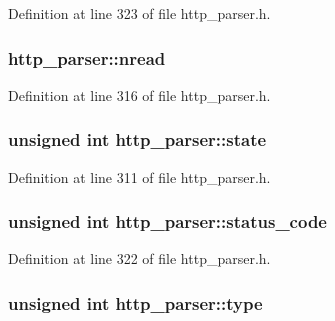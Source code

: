 Definition at line 323 of file http\-\_\-parser.\-h.

\hypertarget{structhttp__parser_a78085ca896bb3b9aa1ecb0f6fddc039d}{
\subsubsection[{nread}]{ http\-\_\-parser\-::nread}}\label{structhttp__parser_a78085ca896bb3b9aa1ecb0f6fddc039d}


Definition at line 316 of file http\-\_\-parser.\-h.

\hypertarget{structhttp__parser_a6f5952e0b47c83aeacf64fc287fd8003}{
\subsubsection[{state}]{\setlength{\rightskip}{0pt plus 5cm}unsigned int http\-\_\-parser\-::state}}\label{structhttp__parser_a6f5952e0b47c83aeacf64fc287fd8003}


Definition at line 311 of file http\-\_\-parser.\-h.

\hypertarget{structhttp__parser_a82f5aed92ca3566489def7bc384bab26}{
\subsubsection[{status\-\_\-code}]{\setlength{\rightskip}{0pt plus 5cm}unsigned int http\-\_\-parser\-::status\-\_\-code}}\label{structhttp__parser_a82f5aed92ca3566489def7bc384bab26}


Definition at line 322 of file http\-\_\-parser.\-h.

\hypertarget{structhttp__parser_ac6c327558547d55eb64a8aea1310cc2e}{
\subsubsection[{type}]{\setlength{\rightskip}{0pt plus 5cm}unsigned int http\-\_\-parser\-::type}}\label{structhttp__parser_ac6c327558547d55eb64a8aea1310cc2e}


